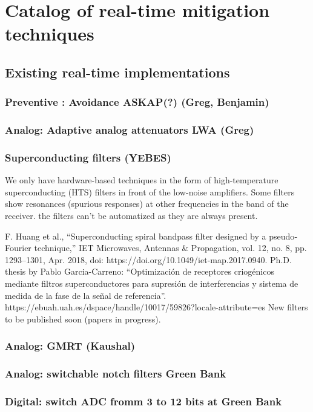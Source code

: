\section{Catalog of real-time mitigation techniques}
\label{section:hardware:catalog}

\subsection{Existing real-time implementations}
\label{subsection:hardware:catalog:existing}
\subsubsection{Preventive : Avoidance ASKAP(?) (Greg, Benjamin)}
\subsubsection{Analog: Adaptive analog attenuators LWA (Greg)}

\subsubsection{Superconducting filters (YEBES)}
We only have hardware-based techniques in the form of high-temperature superconducting (HTS) filters in front of the low-noise amplifiers.
Some filters show resonances (spurious responses) at other frequencies in the band of the receiver.
the filters can’t be automatized as they are always present.

F. Huang et al., “Superconducting spiral bandpass filter designed by a pseudo‐Fourier technique,” IET Microwaves, Antennas \& Propagation, vol. 12, no. 8, pp. 1293–1301, Apr. 2018, doi: https://doi.org/10.1049/iet-map.2017.0940.
Ph.D. thesis by Pablo Garcia-Carreno: “Optimización de receptores criogénicos mediante filtros superconductores para supresión de interferencias y sistema de medida de la fase de la señal de referencia”. https://ebuah.uah.es/dspace/handle/10017/59826?locale-attribute=es
New filters to be published soon (papers in progress).


\subsubsection{Analog: GMRT (Kaushal)}
\subsubsection{Analog: switchable notch filters Green Bank}
\subsubsection{Digital: switch ADC fromm 3 to 12 bits at Green Bank}

